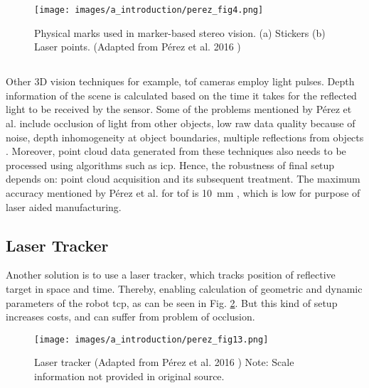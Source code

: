         \begin{figure}[h]
            \centering
            \texttt{[image: images/a\_introduction/perez\_fig4.png]}
            \caption{Physical marks used in marker-based stereo vision. (a) Stickers (b) Laser points. (Adapted from Pérez et al. 2016 \cite{perez})}
            \label{fig:fig_perez_4}
        \end{figure}

    \subsection*{}
        Other 3D vision techniques for example, \gls{tof} cameras employ light pulses. Depth information of the scene is calculated based on the time it takes for the reflected light to be received by the sensor. Some of the problems mentioned by Pérez et al. include occlusion of light from other objects, low raw data quality because of noise, depth inhomogeneity at object boundaries, multiple reflections from objects \cite{perez}. Moreover, point cloud data generated from these techniques also needs to be processed using algorithms such as \gls{icp}. Hence, the robustness of final setup depends on: point cloud acquisition and its subsequent treatment. The maximum accuracy mentioned by Pérez et al. for \gls{tof} is \SI{10}{\milli\meter} \cite{perez}, which is low for purpose of laser aided manufacturing.

    \subsection*{Laser Tracker}
        Another solution is to use a laser tracker, which tracks position of reflective target in space and time. Thereby, enabling calculation of geometric and dynamic parameters of the robot \gls{tcp}, as can be seen in Fig. \ref{fig:perez_fig13}. But this kind of setup increases costs, and can suffer from problem of occlusion.  

        \begin{figure}[h]
            \centering
            \texttt{[image: images/a\_introduction/perez\_fig13.png]}
            \caption{Laser tracker (Adapted from Pérez et al. 2016 \cite{perez}) Note: Scale information not provided in original source.}
            \label{fig:perez_fig13}
        \end{figure}
    
